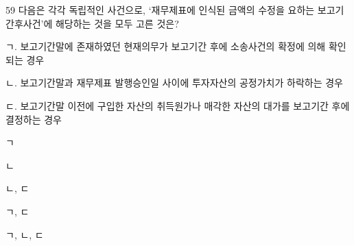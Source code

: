 \begin{question}{59}
다음은 각각 독립적인 사건으로, ‘재무제표에 인식된 금액의 수정을 요하는 보고기간후사건’에 해당하는 것을 모두 고른 것은?
\begin{framedtext}
ㄱ. 보고기간말에 존재하였던 현재의무가 보고기간 후에 소송사건의 확정에 의해 확인되는 경우 \par
ㄴ. 보고기간말과 재무제표 발행승인일 사이에 투자자산의 공정가치가 하락하는 경우 \par
ㄷ. 보고기간말 이전에 구입한 자산의 취득원가나 매각한 자산의 대가를 보고기간 후에 결정하는 경우 \par
\end{framedtext}
\begin{choices}
  \item ㄱ
  \item ㄴ
  \item ㄴ, ㄷ
  \item ㄱ, ㄷ
  \item ㄱ, ㄴ, ㄷ
\end{choices}
\end{question}
